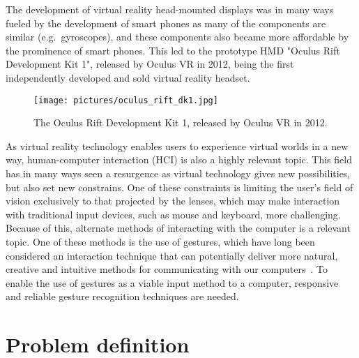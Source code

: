 The development of virtual reality head-mounted displays was in many ways fueled by the development of smart phones as many of the components are similar (e.g.~gyroscopes), and
these components also became more affordable by the prominence of smart phones. 
This led to the prototype HMD "Oculus Rift Development Kit 1", released by Oculus VR in 2012, being the first independently developed and sold virtual reality headset\citep{TW2016}. 

\begin{figure}%
	\texttt{[image: pictures/oculus\_rift\_dk1.jpg]}
	\caption[The Oculus Rift Development Kit 1]{The Oculus Rift Development Kit 1, released by Oculus VR in 2012.}
	\label{fig:oculus}
\end{figure}

As virtual reality technology enables users to experience virtual worlds in a new way, 
human-computer interaction (HCI) is also a highly relevant topic. 
This field has in many ways seen a resurgence as virtual technology gives new possibilities, but also set new constrains. 
One of these constraints is limiting the user's field of vision exclusively to that projected by the lenses, 
which may make interaction with traditional input devices, such as mouse and keyboard, more challenging. 
Because of this, alternate methods of interacting with the computer is a relevant topic. 
One of these methods is the use of gestures, 
which have long been considered an interaction technique that can potentially deliver more natural, 
creative and intuitive methods for communicating with our computers~\citep{Rautaray2015}. 
To enable the use of gestures as a viable input method to a computer, responsive and reliable gesture recognition techniques are needed.  

\section{Problem definition}


